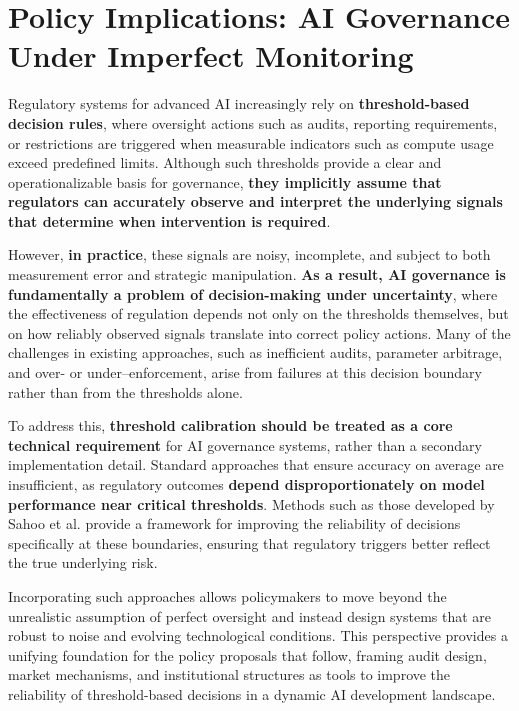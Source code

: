 
\section{Policy Implications: AI Governance Under Imperfect Monitoring}



Regulatory systems for advanced AI increasingly rely on \textbf{threshold-based decision rules}, where oversight actions such as audits, reporting requirements, or restrictions are triggered when measurable indicators such as compute usage exceed predefined limits. Although such thresholds provide a clear and operationalizable basis for governance, \textbf{they implicitly assume that regulators can accurately observe and interpret the underlying signals that determine when intervention is required}. 

However, \textbf{in practice}, these signals are noisy, incomplete, and subject to both measurement error and strategic manipulation. \textbf{As a result, AI governance is fundamentally a problem of decision-making under uncertainty}, where the effectiveness of regulation depends not only on the thresholds themselves, but on how reliably observed signals translate into correct policy actions. Many of the challenges in existing approaches, such as inefficient audits, parameter arbitrage, and over- or under--enforcement, arise from failures at this decision boundary rather than from the thresholds alone.

To address this, \textbf{threshold calibration should be treated as a core technical requirement} for AI governance systems, rather than a secondary implementation detail. Standard approaches that ensure accuracy on average are insufficient, as regulatory outcomes \textbf{depend disproportionately on model performance near critical thresholds}. Methods such as those developed by Sahoo et al. provide a framework for improving the reliability of decisions specifically at these boundaries, ensuring that regulatory triggers better reflect the true underlying risk. 

Incorporating such approaches allows policymakers to move beyond the unrealistic assumption of perfect oversight and instead design systems that are robust to noise and evolving technological conditions. This perspective provides a unifying foundation for the policy proposals that follow, framing audit design, market mechanisms, and institutional structures as tools to improve the reliability of threshold-based decisions in a dynamic AI development landscape.


